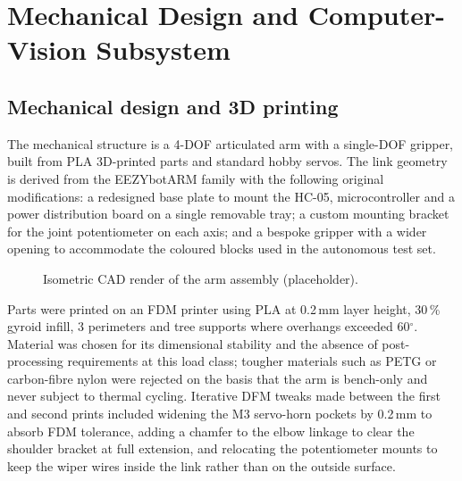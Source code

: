 \section{Mechanical Design and Computer-Vision Subsystem}
\label{sec:cad}

\subsection{Mechanical design and 3D printing}
The mechanical structure is a 4-DOF articulated arm with a single-DOF
gripper, built from PLA 3D-printed parts and standard hobby servos.
The link geometry is derived from the EEZYbotARM family with the
following original modifications: a redesigned base plate to mount the
HC-05, microcontroller and a power distribution board on a single
removable tray; a custom mounting bracket for the joint potentiometer
on each axis; and a bespoke gripper with a wider opening to accommodate
the coloured blocks used in the autonomous test set.

\begin{figure}[t]
  \centering
  \caption{Isometric CAD render of the arm assembly (placeholder).}
  \label{fig:cadrender}
\end{figure}

Parts were printed on an FDM printer using PLA at 0.2\,mm layer
height, 30\,\% gyroid infill, 3 perimeters and tree supports where
overhangs exceeded 60$^\circ$. Material was chosen for its dimensional
stability and the absence of post-processing requirements at this
load class; tougher materials such as PETG or carbon-fibre nylon
were rejected on the basis that the arm is bench-only and never
subject to thermal cycling. Iterative DFM tweaks made between the
first and second prints included widening the M3 servo-horn pockets
by 0.2\,mm to absorb FDM tolerance, adding a chamfer to the elbow
linkage to clear the shoulder bracket at full extension, and
relocating the potentiometer mounts to keep the wiper wires inside
the link rather than on the outside surface.

